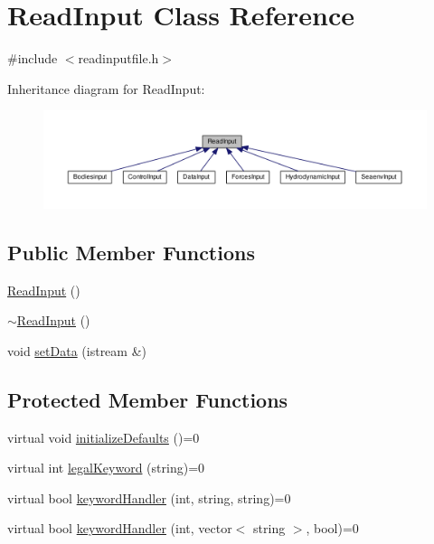 \hypertarget{class_read_input}{\section{Read\-Input Class Reference}
\label{class_read_input}
}


{\ttfamily \#include $<$readinputfile.\-h$>$}



Inheritance diagram for Read\-Input\-:\nopagebreak
\begin{figure}[H]
\begin{center}
\leavevmode
\includegraphics[width=350pt]{class_read_input__inherit__graph}
\end{center}
\end{figure}
\subsection*{Public Member Functions}
\begin{DoxyCompactItemize}
\item 
\hyperlink{class_read_input_a181da3d718520ea9168808dde2d3e867}{Read\-Input} ()
\item 
\hyperlink{class_read_input_aec19e94e448ed46207c55412a61728fa}{$\sim$\-Read\-Input} ()
\item 
void \hyperlink{class_read_input_a0cebeb9dda7e4508fdc7a295229b8e07}{set\-Data} (istream \&)
\end{DoxyCompactItemize}
\subsection*{Protected Member Functions}
\begin{DoxyCompactItemize}
\item 
virtual void \hyperlink{class_read_input_a4ff2727b876cfd7c01299b08bdd65646}{initialize\-Defaults} ()=0
\item 
virtual int \hyperlink{class_read_input_a4c67f10e813686bf635dd4c6bb2c61bc}{legal\-Keyword} (string)=0
\item 
virtual bool \hyperlink{class_read_input_a1d8cb0ef59f265300b682de97513f48d}{keyword\-Handler} (int, string, string)=0
\item 
virtual bool \hyperlink{class_read_input_afb66a7ff67d0aeb10a3cfa5a4fbc31f8}{keyword\-Handler} (int, vector$<$ string $>$, bool)=0
\end{DoxyCompactItemize}


